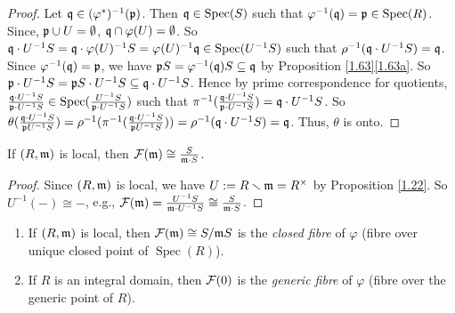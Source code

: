 \begin{proof}
    Let $\mathfrak{q} \in (\varphi^*)^{-1}(\mathfrak{p})$. Then $\mathfrak{q} \in \operatorname{Spec}(S)$ such that $\varphi^{-1}(\mathfrak{q}) = \mathfrak{p} \in \operatorname{Spec}(R)$. Since, $\mathfrak{p} \cup U = \emptyset$, $\mathfrak{q} \cap \varphi(U) = \emptyset$. So $\mathfrak{q} \cdot U^{-1}S = \mathfrak{q} \cdot \varphi(U)^{-1}S = \varphi(U)^{-1} \mathfrak{q} \in \operatorname{Spec}(U^{-1}S)$ such that $\rho^{-1}(\mathfrak{q} \cdot U^{-1}S) = \mathfrak{q}$. Since $\varphi^{-1}(\mathfrak{q}) = \mathfrak{p}$, we have $\mathfrak{p} S = \varphi^{-1}(\mathfrak{q})S \subseteq \mathfrak{q}$ by Proposition \ref{1.63}\ref{1.63a}. So $\mathfrak{p} \cdot U^{-1}S = \mathfrak{p} S \cdot U^{-1}S \subseteq \mathfrak{q} \cdot U^{-1}S$. Hence by prime correspondence for quotients, $\frac{\mathfrak{q} \cdot U^{-1}S}{\mathfrak{p} \cdot U^{-1}S} \in \operatorname{Spec}(\frac{U^{-1}S}{\mathfrak{p} \cdot U^{-1}S})$ such that $\pi^{-1}(\frac{\mathfrak{q} \cdot U^{-1}S}{\mathfrak{p} \cdot U^{-1}S}) = \mathfrak{q} \cdot U^{-1}S$. So $\theta(\frac{\mathfrak{q} \cdot U^{-1}S}{\mathfrak{p} U^{-1}S}) = \rho^{-1}(\pi^{-1}(\frac{\mathfrak{q} \cdot U^{-1}S}{\mathfrak{p} U^{-1}S})) = \rho^{-1}(\mathfrak{q} \cdot U^{-1}S) = \mathfrak{q}$. Thus, $\theta$ is onto. \qedhere
\end{proof}

\begin{proposition}\label{3.25}
    If $(R,\mathfrak{m})$ is local, then $\mathcal{F}(\mathfrak{m}) \cong \frac{S}{\mathfrak{m} \cdot S}$.
\end{proposition}

\begin{proof}
    Since $(R,\mathfrak{m})$ is local, we have $U := R \smallsetminus \mathfrak{m} = R^\times$ by Proposition \ref{1.22}. So $U^{-1}(-) \cong -$, e.g., $\mathcal{F}(\mathfrak{m}) = \frac{U^{-1}S}{\mathfrak{m} \cdot U^{-1}S} \cong \frac{S}{\mathfrak{m} \cdot S}$.
\end{proof}

\begin{definition}\label{3.26}
    \begin{enumerate}
        \item 
            If $(R,\mathfrak{m})$ is local, then $\mathcal{F}(\mathfrak{m}) \cong S/\mathfrak{m} S$ is the \emph{closed fibre} of $\varphi$ (fibre over unique closed point of $\operatorname{Spec}(R)$).
        \item 
            If $R$ is an integral domain, then $\mathcal{F}(0)$ is the \emph{generic fibre} of $\varphi$ (fibre over the generic point of $R$).
    \end{enumerate}
\end{definition}

